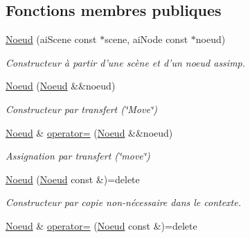 \subsection*{Fonctions membres publiques}
\begin{DoxyCompactItemize}
\item 
\hyperlink{classmodele_1_1_noeud_af36dc9d97d88a25fb09379831a5ac117}{Noeud} (ai\-Scene const $\ast$scene, ai\-Node const $\ast$noeud)
\begin{DoxyCompactList}\small\item\em Constructeur à partir d'une scène et d'un noeud assimp. \end{DoxyCompactList}\item 
\hyperlink{classmodele_1_1_noeud_a41af554e17164a82f8fde7b5a06c245d}{Noeud} (\hyperlink{classmodele_1_1_noeud}{Noeud} \&\&noeud)
\begin{DoxyCompactList}\small\item\em Constructeur par transfert (\char`\"{}\-Move\char`\"{}) \end{DoxyCompactList}\item 
\hyperlink{classmodele_1_1_noeud}{Noeud} \& \hyperlink{classmodele_1_1_noeud_ae802c4f1ecdeae27a440f2705700834e}{operator=} (\hyperlink{classmodele_1_1_noeud}{Noeud} \&\&noeud)
\begin{DoxyCompactList}\small\item\em Assignation par transfert (\char`\"{}move\char`\"{}) \end{DoxyCompactList}\item 
\hypertarget{classmodele_1_1_noeud_a0b746cc9e13a4837b2f856691837397f}{\hyperlink{classmodele_1_1_noeud_a0b746cc9e13a4837b2f856691837397f}{Noeud} (\hyperlink{classmodele_1_1_noeud}{Noeud} const \&)=delete}\label{classmodele_1_1_noeud_a0b746cc9e13a4837b2f856691837397f}

\begin{DoxyCompactList}\small\item\em Constructeur par copie non-\/nécessaire dans le contexte. \end{DoxyCompactList}\item 
\hypertarget{classmodele_1_1_noeud_a7a44b7e1452a09b88f63ef76b22ddec4}{\hyperlink{classmodele_1_1_noeud}{Noeud} \& \hyperlink{classmodele_1_1_noeud_a7a44b7e1452a09b88f63ef76b22ddec4}{operator=} (\hyperlink{classmodele_1_1_noeud}{Noeud} const \&)=delete}\label{classmodele_1_1_noeud_a7a44b7e1452a09b88f63ef76b22ddec4}


\end{DoxyCompactItemize}
